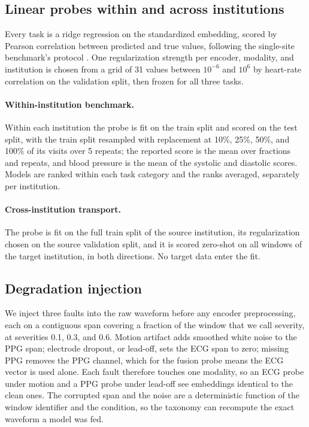 \documentclass[pmlr,twocolumn,10pt]{jmlr}
\begin{document}
\subsection{Linear probes within and across institutions}
\label{sec:probes}

Every task is a ridge regression on the standardized embedding, scored by Pearson correlation between predicted and true values, following the single-site benchmark's protocol \citep{signalmcmed,pedregosa2011sklearn}. One regularization strength per encoder, modality, and institution is chosen from a grid of 31 values between $10^{-6}$ and $10^{6}$ by heart-rate correlation on the validation split, then frozen for all three tasks.

\paragraph{Within-institution benchmark.}
Within each institution the probe is fit on the train split and scored on the test split, with the train split resampled with replacement at 10\%, 25\%, 50\%, and 100\% of its visits over 5 repeats; the reported score is the mean over fractions and repeats, and blood pressure is the mean of the systolic and diastolic scores. Models are ranked within each task category and the ranks averaged, separately per institution.

\paragraph{Cross-institution transport.}
The probe is fit on the full train split of the source institution, its regularization chosen on the source validation split, and it is scored zero-shot on all windows of the target institution, in both directions. No target data enter the fit.

\subsection{Degradation injection}
\label{sec:degradation}

We inject three faults into the raw waveform before any encoder preprocessing, each on a contiguous span covering a fraction of the window that we call severity, at severities 0.1, 0.3, and 0.6. Motion artifact adds smoothed white noise to the PPG span; electrode dropout, or lead-off, sets the ECG span to zero; missing PPG removes the PPG channel, which for the fusion probe means the ECG vector is used alone. Each fault therefore touches one modality, so an ECG probe under motion and a PPG probe under lead-off see embeddings identical to the clean ones. The corrupted span and the noise are a deterministic function of the window identifier and the condition, so the taxonomy can recompute the exact waveform a model was fed.
\end{document}
